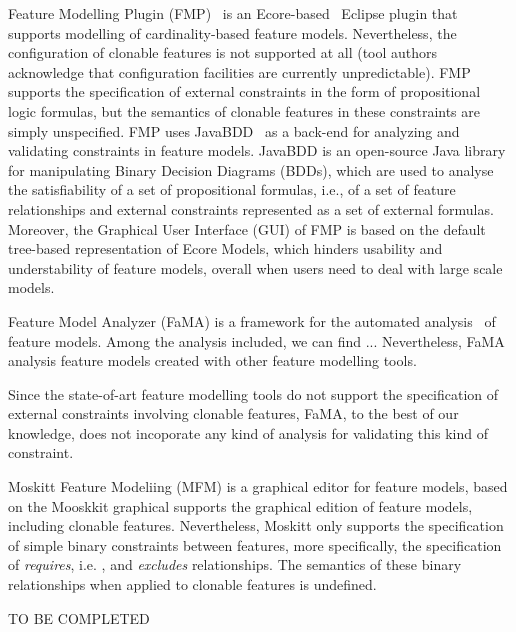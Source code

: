 Feature Modelling Plugin (FMP)~\cite{czarnecki:2005c} is an Ecore-based~\cite{} Eclipse plugin that supports modelling of cardinality-based feature models. Nevertheless, the configuration of clonable features is not supported at all (tool authors acknowledge that configuration facilities are currently unpredictable). FMP supports the specification of external constraints in the form of propositional logic formulas, but the semantics of clonable features in these constraints are simply unspecified. FMP uses JavaBDD~\cite{} as a back-end for analyzing and validating constraints in feature models. JavaBDD is an open-source Java library for manipulating Binary Decision Diagrams (BDDs), which are used to analyse the satisfiability of a set of propositional formulas, i.e., of a set of feature relationships and external constraints represented as a set of external formulas. Moreover, the Graphical User Interface (GUI) of FMP is based on the default tree-based representation of Ecore Models, which hinders usability and understability of feature models, overall when users need to deal with large scale models.

Feature Model Analyzer (FaMA) is a framework for the automated analysis~\cite{} of feature models. Among the analysis included, we can find ... Nevertheless, FaMA analysis feature models created with other feature modelling tools.

Since the state-of-art feature modelling tools do not support the specification of external constraints involving clonable features, FaMA, to the best of our knowledge, does not incoporate any kind of analysis for validating this kind of constraint.



Moskitt Feature Modeliing (MFM) is a graphical editor for feature models, based on the Mooskkit graphical  supports the graphical edition of feature models, including clonable features. Nevertheless, Moskitt only supports the specification of simple binary constraints between features, more specifically, the specification of \emph{requires}, i.e. , and \emph{excludes} relationships. The semantics of these binary relationships when applied to clonable features is undefined.

TO BE COMPLETED





